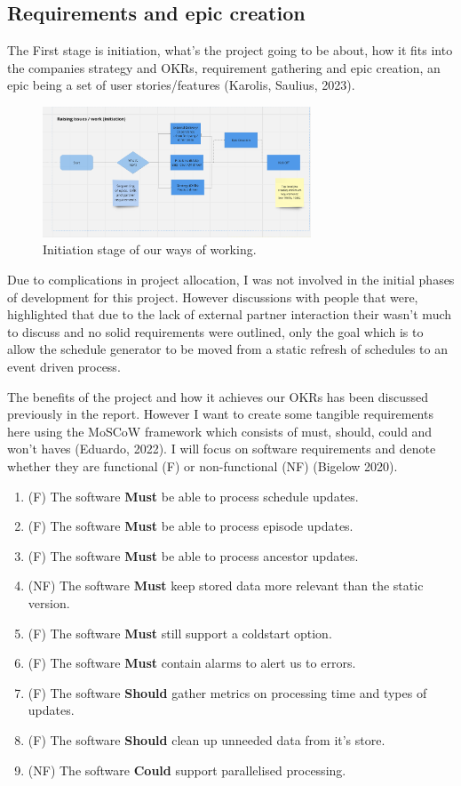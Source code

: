 \subsection{Requirements and epic creation}
  The First stage is initiation, what's the project going to be about, how it fits into the companies strategy and OKRs, requirement gathering 
  and epic creation, an epic being a set of user stories/features (Karolis, Saulius, 2023).

  \begin{figure}[H]
    \centering
    \includegraphics[width=8cm]{assets/workflow/initiate.png}
    \caption{Initiation stage of our ways of working.}
    \label{fig:workflowInitiate}
  \end{figure}

  Due to complications in project allocation, I was not involved in the initial phases of development for this project. However discussions with 
  people that were, highlighted that due to the lack of external partner interaction their wasn't much to discuss and no solid requirements were 
  outlined, only the goal which is to allow the schedule generator to be moved from a static refresh of schedules to an event driven process.

  The benefits of the project and how it achieves our OKRs has been discussed previously in the report. However I want to create some tangible
  requirements here using the MoSCoW framework which consists of must, should, could and won't haves (Eduardo, 2022). I will focus on software requirements and 
  denote whether they are functional (F) or non-functional (NF) (Bigelow 2020).

  \begin{enumerate}
    \item (F) The software \textbf{Must} be able to process schedule updates. 
    \item (F) The software \textbf{Must} be able to process episode updates.
    \item (F) The software \textbf{Must} be able to process ancestor updates.
    \item (NF) The software \textbf{Must} keep stored data more relevant than the static version.
    \item (F) The software \textbf{Must} still support a coldstart option.
    \item (F) The software \textbf{Must} contain alarms to alert us to errors.
    \item (F) The software \textbf{Should} gather metrics on processing time and types of updates.
    \item (F) The software \textbf{Should} clean up unneeded data from it's store.
    \item (NF) The software \textbf{Could} support parallelised processing.
  \end{enumerate}

